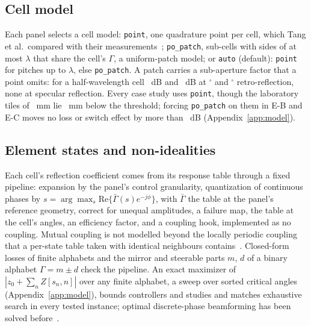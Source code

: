 \subsection{Cell model}\label{sec:model-cells}
Each panel selects a cell model: \texttt{point}, one quadrature point per
cell, which Tang et al.\ compared with their measurements~\cite{Tang2022mmWave};
\texttt{po\_patch}, sub-cells with sides of at most \numSubcellMax$\lambda$ that share the
cell's $\Gamma$, a uniform-patch model; or \texttt{auto} (default): \texttt{point} for
pitches up to \numPointMaxPitch$\lambda$, else \texttt{po\_patch}. A patch carries a
sub-aperture factor that a point omits: for a half-wavelength cell \numCellRetroADb~dB and
\numCellRetroBDb~dB at \numCellRetroAngleA$^\circ$ and \numCellRetroAngleB$^\circ$
retro-reflection, none at specular reflection. Every case study uses \texttt{point},
though the laboratory tiles of \numLabPitchMm~mm lie \numLabPitchMarginMm~mm below the
threshold; forcing \texttt{po\_patch} on them in E-B and E-C moves no loss or switch effect by
more than \numCellSensSwitchMaxDb~dB (Appendix~\ref{app:model}).

\subsection{Element states and non-idealities}\label{sec:model-nonideal}
Each cell's reflection coefficient comes from its response table through a
fixed pipeline: expansion by the panel's control granularity, quantization of continuous
phases by $s=\arg\max_s\mathrm{Re}\{\bar\Gamma(s)e^{-j\phi}\}$, with $\bar\Gamma$ the table at
the panel's reference geometry, correct for unequal amplitudes, a failure map, the
table at the cell's angles, an efficiency factor, and a coupling hook, implemented as no
coupling. Mutual coupling is not modelled beyond the locally periodic coupling that a per-state
table taken with identical neighbours contains~\cite{ETSI_GR_RIS003_v121}. Closed-form losses of finite alphabets and the mirror and
steerable parts $m$, $d$ of a binary alphabet $\Gamma=m\pm d$ check the pipeline. An exact maximizer of $|z_0+\sum_n Z[s_n,n]|$ over any finite
alphabet, a sweep over sorted critical angles (Appendix~\ref{app:model}), bounds controllers
and studies and matches exhaustive search in every tested instance; optimal discrete-phase
beamforming has been solved before~\cite{Zhang2022OptimalBinary,Zhao2024OptimalDiscrete}.

